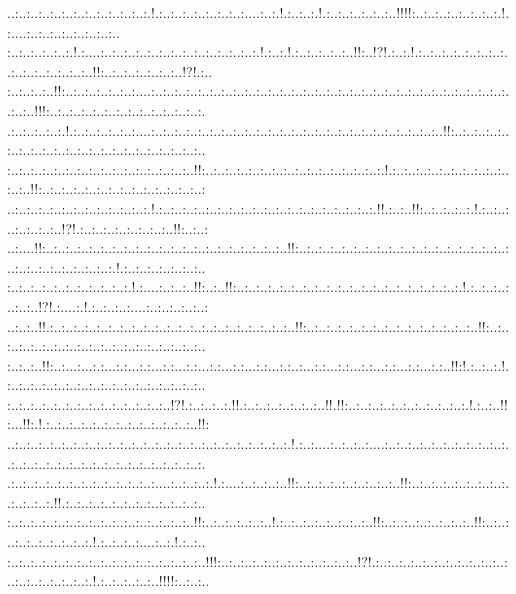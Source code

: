 \documentclass[paper=a4, fontsize=11pt]{scrartcl} %
\numberwithin{equation}{section} %
\numberwithin{figure}{section} %
\numberwithin{table}{section} %
\begin{document}
..:..:..:..:..:..:..:..:..:..:..:..:.!.:..:..:..:..:..:..:..:....:..:.!.:..:..:.!.:..:..:..:..:..:..!!!!:..:..:..:..:..:..:..:.!.:....:..:..:..:..:..:..:..:..\\:..:..:..:..:..:.!.:....:..:..:..:..:..:..:..:..:..:..:..:..:..:.!.:..:.!.:..:..:..:..:..!!:..!?!.:..:.!.:..:..:..:..:..:..:..:..:..:..:..:..:..:..:..!!:..:..:..:..:..:..:..!?!.:..\\:..:..:..:..!!:..:..:..:..:..:..:....:..:..:..:..:..:..:..:..:..:..:..:..:..:..:..:..:..:..:..:..:..:..:..:..:..:..:..:..:..:..:..:..:..!!!:..:..:..:..:..:..:..:..:..:..:..:..:..:.\\.:..:..:..:..:.!.:..:..:..:..:..:....:..:..:..:..:..:..:..:..:..:..:..:..:..:..:..:..:..:..:..:..:..:..:..:..:..!!:..:..:..:..:..:..:..:..:..:..:..:..:..:..:..:..:..:..:..:..:..:..\\:..:..:..:..:..:..:..:..:..:..:..:..:..:..:..:..!!:..:..:..:..:..:..:..:..:..:..:..:..:..:..:..:.!.:..:..:..:..:..:..:..:..:..:..:..:..!!:..:..:..:..:..:..:..:..:..:..:..:..:..:..:\\..:..:..:..:..:..:..:..:..:..:..:..:.!.:..:..:..:..:..:..:..:..:..:..:..:..:..:..:..:..:..:..:.!!.:..:..!!:..:..:..:..:.!.:..:..:..:..:..:..:..!?!.:..:..:..:..:..:..:..:..!!:..:..:\\..:....!!:..:..:..:..:..:..:..:..:..:..:..:..:..:..:..:..:..:..:..:..:..!!:..:..:..:..:..:..:..:..:..:..:..:..:..:..:..:..:..:..:..:..:..:..:..:..:..:..:..:.!.:..:..:..:..:..:..:..\\:..:..:..:..:..:..:..:..:..:..:.!.:....:..:..:..!!:..:..!!:..:..:..:..:..:..:..:..:..:..:..:..:..:..:..:..:..:..:..:.!.:..:..:..:..:..:..!?!.:....:.!.:..:..:..:....:..:..:..:..:..:\\..:..:..!!.:..:..:..:..:..:..:..:..:..:..:..:..:..:..:..:..:..:..:..:..:..!!:..:..:..:..:..:..:..:..:..:..:..:..:..:..:..!!:..:..:..:..:..:..:..:..:..:..:..:..:..:..:..:..:..:..:..\\:..:..:..!!:..:...:...:.:...:.:...:.:...:.:...:.:...:.:...:.:...:.:...:.:..:...:.:...:.:...:.:...:.:...:.:...:.:..!!:!.:..:..:.!.:..:..:..:..:..:..:..:..:..:..:..:..:..:..:..:..:..\\:..:..:..:..:..:..:..:..:..:..:..:..:..:..!?!.:..:..:..:.!!.:..:..:..:..:..:..:..!!.!!:..:..:..:..:..:..:..:..:..:..:.!.:..:..!!:...!!:.!.:..:..:..:..:..:..:..:..:..:..:..:..:..!!:\\..:..:..:..:..:..:..:..:..:..:..:..:..:..:..:..:..:..:..:..:..:..:..:..:.!.:..:....:..:..:..:....:..:..:..:..:..:..:..:..:..:..:..:..:..:..:..:..:..:..:..:..:..:..:..:..:..:..:..:.\\.:..:..:..:..:..:..:..:..:..:..:..:..:....:..:..:..:.!.:....:..:..:..:..!!:..:..:..:..:..:..:..:..:..!!:..:..:..:..:..:..:..:..:..:..:..:..:.!!.:..:..:..:..:..:..:..:..:..:..:..:..\\:..:..:..:..:..:..:..:..:..:..:..:..:..:..:..:..!!:..:..:..:..:..:..!.:..:..:..:..:..:..:..:..!!:..:..:..:..:..:..:..:..!!:..:..:..:..:..:..:..:..:..:.!.:..:..:..:....:..:.!.:..:..\\:..:..:..:..:..:..:..:..:..:..:..:..:..:..:..:..:..!!!:..:..:..:..:..:..:..:..:..:..:..:..!?!.:..:..:..:..:..:..:..:..:..:..:..:..:..:..:..:..:..:..:.!.:..:..:..:..:..!!!!:..:..:..\\
\end{document}
